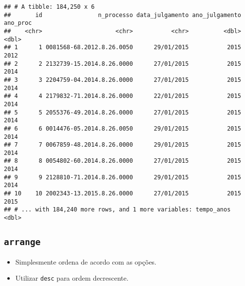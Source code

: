 \documentclass[]{book}
\newenvironment{Shaded}{\begin{snugshade}}{\end{snugshade}}
\newcommand{\KeywordTok}[1]{\textcolor[rgb]{0.13,0.29,0.53}{\textbf{{#1}}}}
\newcommand{\DataTypeTok}[1]{\textcolor[rgb]{0.13,0.29,0.53}{{#1}}}
\newcommand{\DecValTok}[1]{\textcolor[rgb]{0.00,0.00,0.81}{{#1}}}
\newcommand{\StringTok}[1]{\textcolor[rgb]{0.31,0.60,0.02}{{#1}}}
\newcommand{\NormalTok}[1]{{#1}}
\providecommand{\tightlist}{%
  \setlength{\itemsep}{0pt}\setlength{\parskip}{0pt}}
\begin{document}
\begin{verbatim}
## # A tibble: 184,250 x 6
##       id                n_processo data_julgamento ano_julgamento ano_proc
##    <chr>                     <chr>           <chr>          <dbl>    <dbl>
## 1      1 0081568-68.2012.8.26.0050      29/01/2015           2015     2012
## 2      2 2132739-15.2014.8.26.0000      27/01/2015           2015     2014
## 3      3 2204759-04.2014.8.26.0000      27/01/2015           2015     2014
## 4      4 2179832-71.2014.8.26.0000      22/01/2015           2015     2014
## 5      5 2055376-49.2014.8.26.0000      27/01/2015           2015     2014
## 6      6 0014476-05.2014.8.26.0050      29/01/2015           2015     2014
## 7      7 0067859-48.2014.8.26.0000      29/01/2015           2015     2014
## 8      8 0054802-60.2014.8.26.0000      27/01/2015           2015     2014
## 9      9 2128810-71.2014.8.26.0000      29/01/2015           2015     2014
## 10    10 2002343-13.2015.8.26.0000      27/01/2015           2015     2015
## # ... with 184,240 more rows, and 1 more variables: tempo_anos <dbl>
\end{verbatim}

\subsection{\texorpdfstring{\texttt{arrange}}{arrange}}\label{arrange}

\begin{itemize}
\tightlist
\item
  Simplesmente ordena de acordo com as opções.
\item
  Utilizar \texttt{desc} para ordem decrescente.
\end{itemize}

\begin{Shaded}
\end{Shaded}
\end{document}
